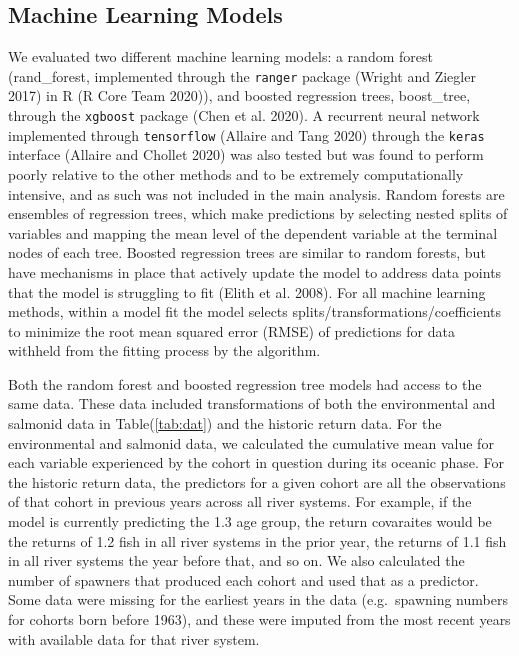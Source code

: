 \documentclass[
]{article}
\begin{document}
\hypertarget{machine-learning-models}{%
\subsection{Machine Learning Models}\label{machine-learning-models}}

We evaluated two different machine learning models: a random forest (rand\_forest, implemented through the \texttt{ranger} package (Wright and Ziegler 2017) in R (R Core Team 2020)), and boosted regression trees, boost\_tree, through the \texttt{xgboost} package (Chen et al. 2020). A recurrent neural network implemented through \texttt{tensorflow} (Allaire and Tang 2020) through the \texttt{keras} interface (Allaire and Chollet 2020) was also tested but was found to perform poorly relative to the other methods and to be extremely computationally intensive, and as such was not included in the main analysis. Random forests are ensembles of regression trees, which make predictions by selecting nested splits of variables and mapping the mean level of the dependent variable at the terminal nodes of each tree. Boosted regression trees are similar to random forests, but have mechanisms in place that actively update the model to address data points that the model is struggling to fit (Elith et al. 2008). For all machine learning methods, within a model fit the model selects splits/transformations/coefficients to minimize the root mean squared error (RMSE) of predictions for data withheld from the fitting process by the algorithm.

Both the random forest and boosted regression tree models had access to the same data. These data included transformations of both the environmental and salmonid data in Table(\ref{tab:dat}) and the historic return data. For the environmental and salmonid data, we calculated the cumulative mean value for each variable experienced by the cohort in question during its oceanic phase. For the historic return data, the predictors for a given cohort are all the observations of that cohort in previous years across all river systems. For example, if the model is currently predicting the 1.3 age group, the return covaraites would be the returns of 1.2 fish in all river systems in the prior year, the returns of 1.1 fish in all river systems the year before that, and so on. We also calculated the number of spawners that produced each cohort and used that as a predictor. Some data were missing for the earliest years in the data (e.g.~spawning numbers for cohorts born before 1963), and these were imputed from the most recent years with available data for that river system.
\end{document}
